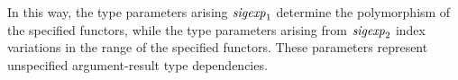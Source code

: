 \begin{description}
     

     In this way, the type parameters arising ${\it sigexp}_1$ determine the polymorphism of the specified
     functors, while  
     the type parameters
     arising from ${\it sigexp}_2$ index variations in the range
     of the specified functors. These parameters
     represent unspecified argument-result type dependencies.
\end{description}





